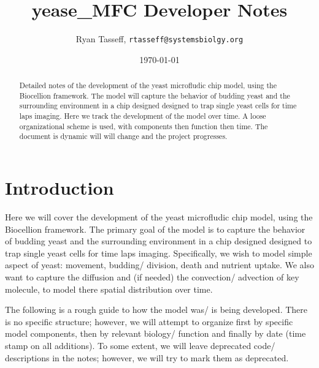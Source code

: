 \documentclass{article}
\title{yease\_MFC Developer Notes} %
\author{Ryan Tasseff, \texttt{rtasseff@systemsbiolgy.org}}  %
\date{\today}  %
\begin{document}
\maketitle


\begin{abstract}
Detailed notes of the development of the yeast microfludic chip model,
using the Biocellion framework.
The model will capture the behavior of 
budding yeast and the surrounding environment in a chip designed 
designed to trap single yeast cells for time laps imaging.
Here we track the development of the model over time.
A loose organizational scheme is used, with components then function then time.
The document is dynamic will will change and the project progresses. \end{abstract}
 
\section{Introduction}
Here we will cover the development of the yeast microfludic chip model,
using the Biocellion framework.
The primary goal of the model is to capture the behavior of 
budding yeast and the surrounding environment in a chip designed 
designed to trap single yeast cells for time laps imaging.
Specifically, we wish to model simple aspect of yeast: 
movement, budding/ division, death and nutrient uptake.
We also want to capture the diffusion and (if needed) the 
convection/ advection of key molecule, 
to model there spatial distribution over time.

The following is a rough guide to how the model was/ is being developed.
There is no specific structure; however, 
we will attempt to organize first by specific model components, 
then by relevant biology/ function and finally by date (time stamp on all additions).
To some extent, we will leave deprecated code/ descriptions
in the notes; however, we will try to mark them as deprecated.
\end{document}
